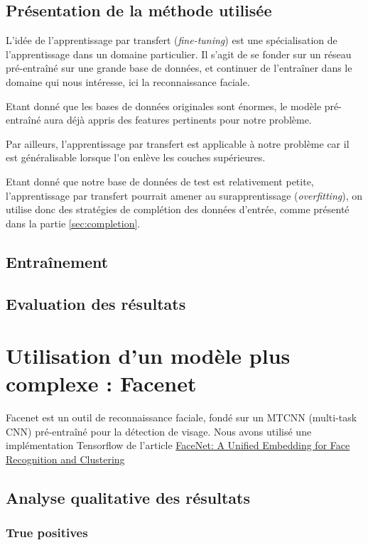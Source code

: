 \documentclass[a4paper,11pt]{article}
\begin{document}
\subsection{Présentation de la méthode utilisée}
\label{sec:transfert_learning}

L'idée de l'apprentissage par transfert (\textit{fine-tuning}) est une spécialisation de
l'apprentissage dans un domaine particulier. Il s'agit de se fonder sur un réseau pré-entraîné sur
une grande base de données, et continuer de l'entraîner dans le domaine qui nous intéresse, ici la reconnaissance faciale.

Etant donné que les bases de données originales sont énormes, le modèle pré-entraîné aura déjà appris des features pertinents pour notre problème.

Par ailleurs, l'apprentissage par transfert est applicable à notre problème car il est généralisable
lorsque l'on enlève les couches supérieures.

Etant donné que notre base de données de test est relativement petite, l'apprentissage par transfert pourrait amener au surapprentissage (\textit{overfitting}), on utilise donc des stratégies de complétion des données d'entrée, comme présenté dans la partie \ref{sec:completion}.

    \subsection{Entraînement}
    \subsection{Evaluation des résultats}

\section{Utilisation d'un modèle plus complexe : Facenet}

    Facenet est un outil de reconnaissance faciale, fondé sur un MTCNN (multi-task CNN) pré-entraîné pour la détection de visage. Nous avons utilisé une implémentation Tensorflow de l'article \href{https://arxiv.org/abs/1503.03832}{FaceNet: A Unified Embedding for Face Recognition and Clustering}

    \subsection{Analyse qualitative des résultats}
	\subsubsection{True positives}
\end{document}
